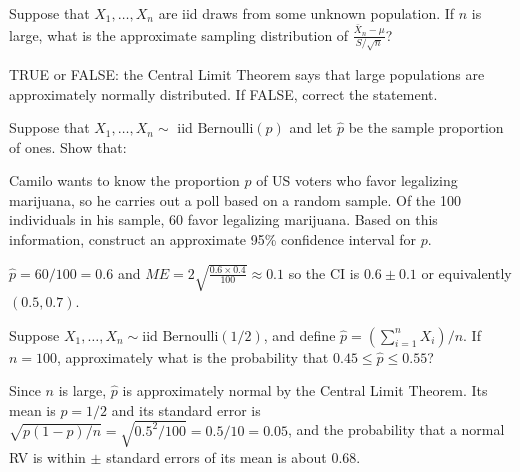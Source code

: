 \documentclass[addpoints,12pt]{exam}
\begin{document}
\begin{questions}

  \question Suppose that $X_1, \dots, X_n$ are iid draws from some unknown population. If $n$ is large, what is the approximate sampling distribution of $\frac{\bar{X}_n - \mu}{S/\sqrt{n}}$?

\question TRUE or FALSE: the Central Limit Theorem says that large populations are approximately normally distributed. If FALSE, correct the statement.

\question Suppose that $X_1, \dots, X_n \sim \mbox { iid Bernoulli}(p)$ and let $\widehat{p}$ be the sample proportion of ones. Show that:

  \question Camilo wants to know the proportion $p$ of US voters who favor legalizing marijuana, so he carries out a poll based on a random sample.
  Of the 100 individuals in his sample, 60 favor legalizing marijuana.
  Based on this information, construct an approximate 95\% confidence interval for $p$.
  \begin{solution}
    $\widehat{p} = 60/100 = 0.6$ and $ME = 2\displaystyle\sqrt{\frac{0.6 \times 0.4}{100}}\approx 0.1$ so the CI is $0.6 \pm 0.1$ or equivalently $(0.5, 0.7)$.
  \end{solution}

  \question Suppose $X_1, \dots, X_n \sim \mbox{iid Bernoulli}(1/2)$, and define $\widehat{p} = (\sum_{i=1}^n X_i)/n$.
  If $n=100$, approximately what is the probability that $0.45 \leq \widehat{p} \leq 0.55$?
  \begin{solution}
    Since $n$ is large, $\widehat{p}$ is approximately normal by the Central Limit Theorem. 
    Its mean is $p = 1/2$ and its standard error is $\sqrt{p(1-p)/n} = \sqrt{0.5^2/100}= 0.5/10 = 0.05$, and the probability that a normal RV is within $\pm$ standard errors of its mean is about 0.68.
  \end{solution}


\end{questions}
\end{document}
